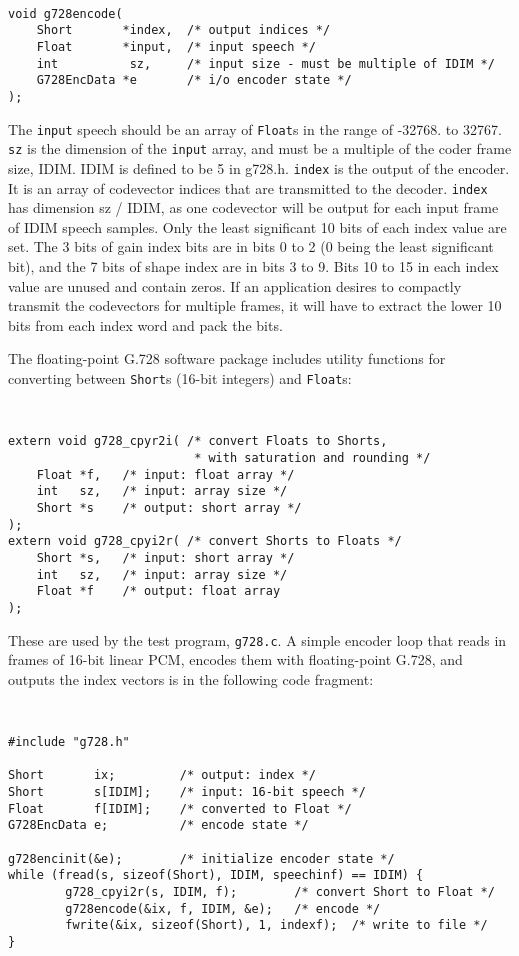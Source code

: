 {\tt\small
\begin{verbatim}
void g728encode(
    Short       *index,  /* output indices */
    Float       *input,  /* input speech */
    int          sz,     /* input size - must be multiple of IDIM */
    G728EncData *e       /* i/o encoder state */	
);
\end{verbatim}
}

The {\tt input} speech should be an array of {\tt Float}s in the range
of -32768. to 32767. {\tt sz} is the dimension of the {\tt input}
array, and must be a multiple of the coder frame size, IDIM.  IDIM is
defined to be 5 in g728.h.  {\tt index} is the output of the
encoder. It is an array of codevector indices that are transmitted to the
decoder.  {\tt index} has dimension sz / IDIM, as one codevector will
be output for each input frame of IDIM speech samples.  Only the least
significant 10 bits of each index value are set.  The 3 bits of gain
index bits are in bits 0 to 2 (0 being the least significant bit), and
the 7 bits of shape index are in bits 3 to 9.  Bits 10 to 15 in each
index value are unused and contain zeros.  If an application desires
to compactly transmit the codevectors for multiple frames, it will
have to extract the lower 10 bits from each index word and pack the
bits.

The floating-point G.728 software package includes utility functions for
converting between {\tt Short}s (16-bit integers) and {\tt Float}s:

{\tt\small
\begin{verbatim}
extern void g728_cpyr2i( /* convert Floats to Shorts,
                          * with saturation and rounding */
    Float *f,   /* input: float array */
    int   sz,   /* input: array size */
    Short *s    /* output: short array */
);
extern void g728_cpyi2r( /* convert Shorts to Floats */
    Short *s,   /* input: short array */
    int   sz,   /* input: array size */
    Float *f    /* output: float array
);
\end{verbatim}
}

These are used by the test program, {\tt g728.c}. A simple encoder loop
that reads in frames of 16-bit linear PCM, encodes them
with floating-point G.728, and outputs the index vectors is in
the following code fragment:

{\tt\small
\begin{verbatim}
#include "g728.h"

Short       ix;         /* output: index */
Short       s[IDIM];    /* input: 16-bit speech */
Float       f[IDIM];    /* converted to Float */
G728EncData e;          /* encode state */

g728encinit(&e);        /* initialize encoder state */
while (fread(s, sizeof(Short), IDIM, speechinf) == IDIM) {
        g728_cpyi2r(s, IDIM, f);        /* convert Short to Float */
        g728encode(&ix, f, IDIM, &e);   /* encode */
        fwrite(&ix, sizeof(Short), 1, indexf);  /* write to file */
}
\end{verbatim}
}


